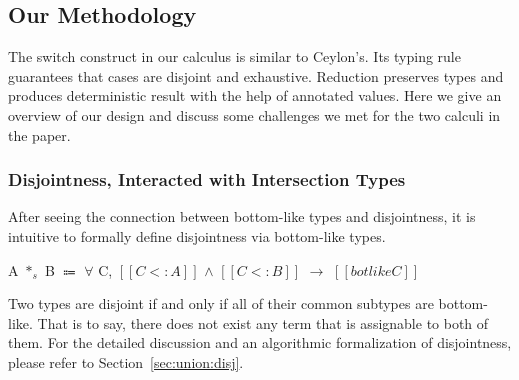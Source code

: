 \begin{comment}
Let us call them \emph{bottom-like types}.
In a switch construct, every case has a type annotation.
In Ceylon, this type annotation is not allowed to be bottom-like.
The compiler uses this type to narrow the static type of the input term
in switch/case, and rejects the program if the resultant type is equivalent
to \lstinline{Nothing}.
\end{comment}
\subsection{Our Methodology}

The switch construct in our calculus \cal is similar to Ceylon's.
Its typing rule guarantees that cases are disjoint and exhaustive.
Reduction preserves types and produces deterministic result with
the help of annotated values.
Here we give an overview of our design and discuss some challenges
we met for the two calculi in the paper.

\subsubsection*{Disjointness, Interacted with Intersection Types}
After seeing the connection between bottom-like types and disjointness,
it is intuitive to formally define disjointness via bottom-like types.

\begin{definition}\label{def:disjointness}
	A $*_s$ B $\Coloneqq$ $\forall$ C, $[[C <: A]]$ $\wedge$ $[[C <: B]]$ $\rightarrow$ $[[botlike C]]$
	\label{def:union:disj}
\end{definition}


Two types are disjoint if and only if all of their common subtypes are bottom-like.
That is to say, there does not exist any term that is assignable to both of
them.
For the detailed discussion and an algorithmic formalization of
disjointness, please refer to Section~\ref{sec:union:disj}.

